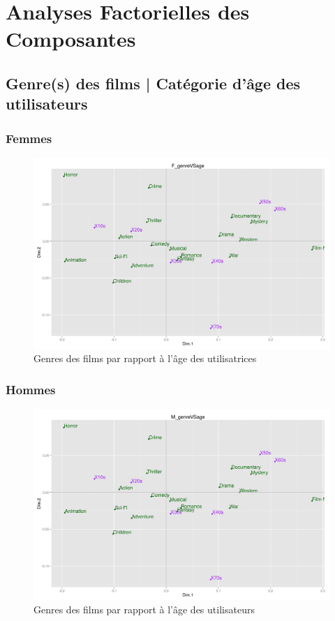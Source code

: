 \chapter{Analyses Factorielles des Composantes}

\section{Genre(s) des films | Catégorie d'âge des utilisateurs}
\subsection{Femmes}
\begin{figure}[htd]
\centering
\includegraphics[scale=0.4]{./images/F_genreVSage}
\caption{Genres des films par rapport à l'âge des utilisatrices}
\end{figure}

\subsection{Hommes}
\begin{figure}[htd]
\centering
\includegraphics[scale=0.4]{./images/M_genreVSage}
\caption{Genres des films par rapport à l'âge des utilisateurs}
\end{figure}


